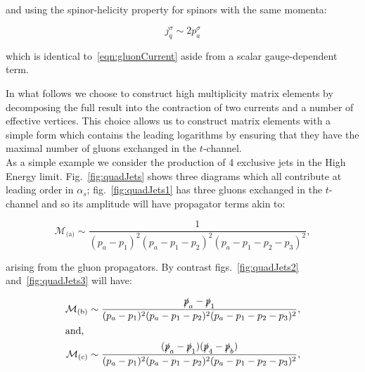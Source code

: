 		and using the spinor-helicity property for spinors with the same momenta:

		\begin{equation}
			j_{q}^\sigma \sim 2p_a^\sigma
		\end{equation}

		which is identical to~\eqref{eqn:gluonCurrent} aside from a scalar gauge-dependent term.

		In what
		follows we choose to construct high multiplicity matrix elements by decomposing the full result
		into the contraction of two currents and a number of effective vertices.  This choice allows us
		to construct matrix elements with a simple form which contains the leading logarithms by
		ensuring that they have the maximal number of gluons exchanged in the $t$-channel.\\
		As a simple example we consider the production of 4 exclusive jets in the High Energy limit.
		Fig.~\eqref{fig:quadJets} shows three diagrams which all contribute at leading order in $\alpha_s$;
		fig.~\eqref{fig:quadJets1} has three gluons exchanged in the $t$-channel and so its amplitude will
		have propagator terms akin to:

		\begin{equation}
			\mathcal{M}_{\text{(a)}}\sim\frac{1}{(p_a - p_1)^2(p_a - p_1 - p_2)^2(p_a - p_1 - p_2 - p_3)^2},
		\end{equation}

		arising from the gluon propagators.  By contrast figs.~\eqref{fig:quadJets2} and~\eqref{fig:quadJets3} will
		have:

		\begin{align}
			\mathcal{M}_{\text{(b)}}\sim\frac{\slashed p_a - \slashed p_1}
			{(p_a - p_1)^2(p_a - p_1 - p_2)^2(p_a - p_1 - p_2 - p_3)^2},\\
			\intertext{and,}
			\mathcal{M}_{\text{(c)}}\sim\frac{(\slashed p_a - \slashed p_1)(\slashed p_4 - \slashed p_b)}
			{(p_a - p_1)^2(p_a - p_1 - p_2)^2(p_a - p_1 - p_2 - p_3)^2},
		\end{align}

